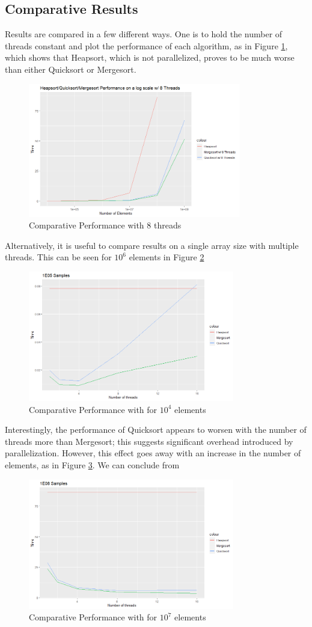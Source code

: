 \documentclass[conference]{IEEEtran}
\begin{document}
	\subsection{Comparative Results}
	Results are compared in a few different ways.
	One is to hold the number of threads constant and plot the performance of each algorithm, as in Figure \ref{msqshs}, which shows that Heapsort, which is not parallelized, proves to be much worse than either Quicksort or Mergesort.
	\begin{figure}
		\includegraphics[width=9.25cm]{mshsqs.png}
		\caption{Comparative Performance with 8 threads}
		\label{msqshs}
	\end{figure}
	Alternatively, it is useful to compare results on a single array size with multiple threads.
	This can be seen for $10^6$ elements in Figure \ref{1e5}
	\begin{figure}
		\includegraphics[width=9cm]{1e5.png}
		\caption{Comparative Performance with for $10^4$ elements}
		\label{1e5}
	\end{figure}
	Interestingly, the performance of Quicksort appears to worsen with the number of threads more than Mergesort; this suggests significant overhead introduced by parallelization.
	However, this effect goes away with an increase in the number of elements, as in Figure \ref{1e8}.
	We can conclude from
	\begin{figure}
		\includegraphics[width=9cm]{1e8.png}
		\caption{Comparative Performance with for $10^7$ elements}
		\label{1e8}
	\end{figure}
	
\end{document}
